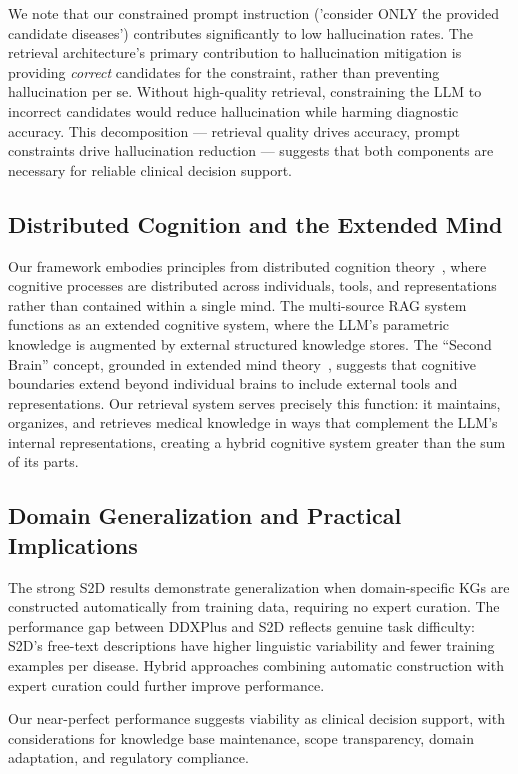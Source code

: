 \documentclass[preprint,12pt]{elsarticle}
\begin{document}
We note that our constrained prompt instruction ('consider ONLY the provided candidate diseases') contributes significantly to low hallucination rates. The retrieval architecture's primary contribution to hallucination mitigation is providing \emph{correct} candidates for the constraint, rather than preventing hallucination per se. Without high-quality retrieval, constraining the LLM to incorrect candidates would reduce hallucination while harming diagnostic accuracy. This decomposition — retrieval quality drives accuracy, prompt constraints drive hallucination reduction — suggests that both components are necessary for reliable clinical decision support.

\subsection{Distributed Cognition and the Extended Mind}

Our framework embodies principles from distributed cognition theory~\cite{hutchins1995cognition}, where cognitive processes are distributed across individuals, tools, and representations rather than contained within a single mind. The multi-source RAG system functions as an extended cognitive system, where the LLM's parametric knowledge is augmented by external structured knowledge stores. The ``Second Brain'' concept, grounded in extended mind theory~\cite{clark1998extended}, suggests that cognitive boundaries extend beyond individual brains to include external tools and representations. Our retrieval system serves precisely this function: it maintains, organizes, and retrieves medical knowledge in ways that complement the LLM's internal representations, creating a hybrid cognitive system greater than the sum of its parts.

\subsection{Domain Generalization and Practical Implications}

The strong S2D results demonstrate generalization when domain-specific KGs are constructed automatically from training data, requiring no expert curation. The performance gap between DDXPlus and S2D reflects genuine task difficulty: S2D's free-text descriptions have higher linguistic variability and fewer training examples per disease. Hybrid approaches combining automatic construction with expert curation could further improve performance.

Our near-perfect performance suggests viability as clinical decision support, with considerations for knowledge base maintenance, scope transparency, domain adaptation, and regulatory compliance.
\end{document}
